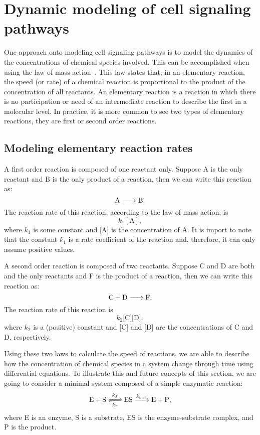 \section{Dynamic modeling of cell signaling pathways}
One approach onto modeling cell signaling pathways is to model the 
dynamics of the concentrations of chemical species involved. This can be
accomplished when using the law of mass action~\cite{Voet2010}. This law 
states that, in an elementary reaction, the speed (or rate) of a 
chemical reaction is proportional to the product of the concentration of 
all reactants. An elementary reaction is a reaction in which there is no 
participation or need of an intermediate reaction to describe the first 
in a molecular level. In practice, it is more common to see two types of 
elementary reactions, they are first or second order reactions. 

\subsection{Modeling elementary reaction rates}
A first order reaction is composed of one reactant only. Suppose A is 
the only reactant and B is the only product of a reaction, then we can
write this reaction as:
\begin{equation*}
\ce{
    A -> B
}.
\end{equation*}
The reaction rate of this reaction, according to the law of mass 
action, is 
\begin{equation*}
    k_1[\text{A}],
\end{equation*}
where $k_1$ is some constant and [A] is the concentration of A. It is
import to note that the constant $k_1$ is a rate coefficient of the 
reaction and, therefore, it can only assume positive values.

A second order reaction is composed of two reactants. Suppose C and D 
are both and the only reactants and F is the product of a reaction, then
we can write this reaction as:
\begin{equation*}
\ce{
    C + D -> F
}.
\end{equation*}
The reaction rate of this reaction is
\begin{equation*}
    k_2\text{[C][D]},
\end{equation*}
where $k_2$ is a (positive) constant and [C] and [D] are the 
concentrations of C and D, respectively.

Using these two laws to calculate the speed of reactions, we are able 
to describe how the concentration of chemical species in a system change 
through time using differential equations. To illustrate this and future 
concepts of this section, we are going to consider a minimal system 
composed of a simple enzymatic reaction:
\begin{equation}
\ce{
    E + S <=>[\ce{$k$_f}][\ce{$k$_r}] ES ->[\ce{$k_{cat}$}] E + P
},
\label{eq:simple_enzymatic}
\end{equation}
where E is an enzyme, S is a substrate, ES is the enzyme-substrate
complex, and P is the product.

